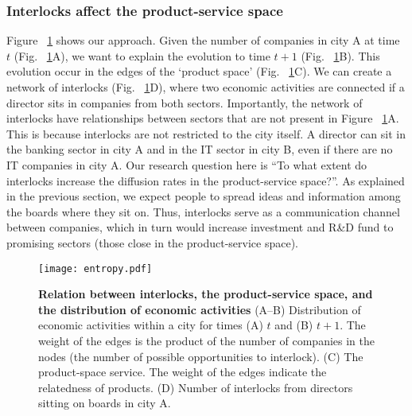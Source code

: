 \subsubsection{Interlocks affect the product-service space}
Figure ~\ref{fig:entropy} shows our approach. 
Given the number of companies in city A at time $t$ (Fig. ~\ref{fig:entropy}A), 
we want to explain the evolution to time $t+1$ (Fig. ~\ref{fig:entropy}B).
This evolution occur in the edges of the `product space' (Fig. ~\ref{fig:entropy}C).
We can create a network of interlocks (Fig. ~\ref{fig:entropy}D),
where two economic activities are connected if a director sits in companies from both sectors.
Importantly, the network of interlocks have relationships between sectors that are not present in Figure ~\ref{fig:entropy}A. 
This is because interlocks are not restricted to the city itself.
A director can sit in the banking sector in city A and in the IT sector in city B, even if there are no IT companies in city A.
Our research question here is ``To what extent do interlocks increase the diffusion rates in the product-service space?''.
As explained in the previous section, 
we expect people to spread ideas and information among the boards where they sit on.
Thus, interlocks serve as a communication channel between companies, 
which in turn would increase investment and R\&D fund to promising sectors (those close in the product-service space).

\begin{figure}
\begin{center}
\texttt{[image: entropy.pdf]}
\caption{\textbf{Relation between interlocks, the product-service space, and the distribution of economic activities} (A--B) Distribution of economic activities within a city for times (A) $t$ and (B) $t+1$. The weight of the edges is the product of the number of companies in the nodes (the number of possible opportunities to interlock). (C) The product-space service. The weight of the edges indicate the relatedness of products. (D) Number of interlocks from directors sitting on boards in city A.}
\label{fig:entropy}
\end{center}
\end{figure}

